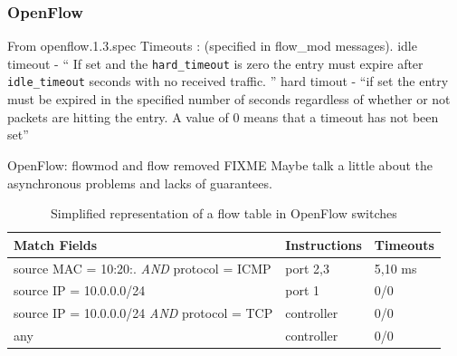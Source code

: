 \begin{itemize}
\begin{itemize}
\end{itemize}
\subsubsection{OpenFlow}

From openflow.1.3.spec \cite{openflow-spec}
Timeouts : (specified in flow\_mod messages). 
idle timeout - `` If set and the \texttt{hard\_timeout} is zero the entry must expire after \texttt{idle\_timeout} seconds with no received traffic. ''
hard timout  - ``if set the entry must be expired in the specified number of seconds regardless of whether or not packets are hitting the entry. A value of 0 means that a timeout has not been set''

OpenFlow: flowmod and flow removed FIXME 
Maybe talk a little about the asynchronous problems and lacks of guarantees. 
\begin{table}[ht]
  \centering
  \begin{tabular}[ht]{lll}
    Match Fields &  Instructions & Timeouts \\ \toprule 
    source MAC = 10:20:. \emph{AND}  protocol = ICMP  & port 2,3 & 5,10 ms \\ 
    source IP = 10.0.0.0/24  & port 1 &  0/0 \\
    source IP = 10.0.0.0/24 \emph{AND} protocol = TCP & controller & 0/0 \\ 
    any & controller & 0/0 \\ \bottomrule 
  \end{tabular}
  \caption{Simplified representation of a flow table in OpenFlow switches }
  
\end{table}



\end{itemize}
